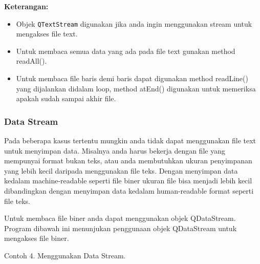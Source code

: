 \textbf{Keterangan:}

\begin{itemize}
\tightlist
\item
  Objek \texttt{QTextStream} digunakan jika anda ingin menggunakan
  stream untuk mengakses file text.
\item
  Untuk membaca semua data yang ada pada file text gunakan method
  readAll().
\item
  Untuk membaca file baris demi baris dapat digunakan method readLine()
  yang dijalankan didalam loop, method atEnd() digunakan untuk memeriksa
  apakah sudah sampai akhir file.
\end{itemize}

\subsubsection{Data Stream}\label{data-stream}

Pada beberapa kasus tertentu mungkin anda tidak dapat menggunakan file
text untuk menyimpan data. Misalnya anda harus bekerja dengan file yang
mempunyai format bukan teks, atau anda membutuhkan ukuran penyimpanan
yang lebih kecil daripada menggunakan file teks. Dengan menyimpan data
kedalam machine-readable seperti file biner ukuran file bisa menjadi
lebih kecil dibandingkan dengan menyimpan data kedalam human-readable
format seperti file teks.

Untuk membaca file biner anda dapat menggunakan objek QDataStream.
Program dibawah ini menunjukan penggunaan objek QDataStream untuk
mengakses file biner.

Contoh 4. Menggunakan Data Stream.

